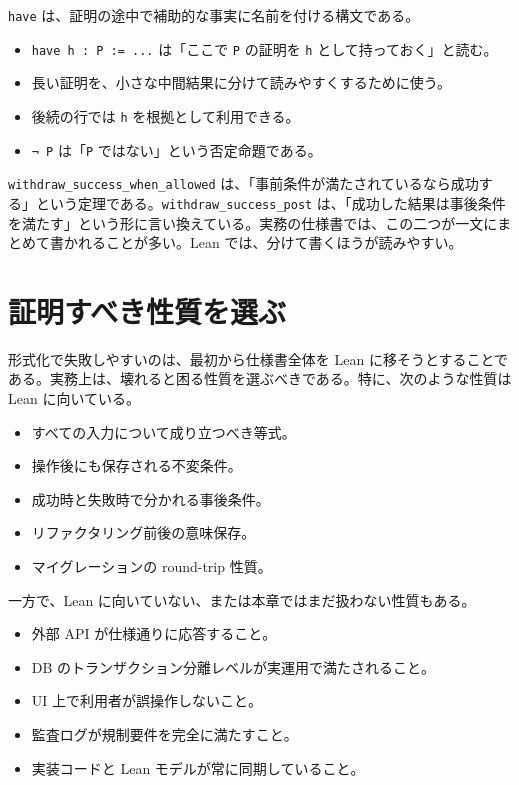 \begin{syntaxbox}
\texttt{have} は、証明の途中で補助的な事実に名前を付ける構文である。
\begin{itemize}
\item \texttt{have h : P := ...} は「ここで \texttt{P} の証明を \texttt{h} として持っておく」と読む。
\item 長い証明を、小さな中間結果に分けて読みやすくするために使う。
\item 後続の行では \texttt{h} を根拠として利用できる。
\item \texttt{¬ P} は「\texttt{P} ではない」という否定命題である。
\end{itemize}
\end{syntaxbox}


\texttt{withdraw\_success\_when\_allowed} は、「事前条件が満たされているなら成功する」という定理である。\texttt{withdraw\_success\_post} は、「成功した結果は事後条件を満たす」という形に言い換えている。実務の仕様書では、この二つが一文にまとめて書かれることが多い。Lean では、分けて書くほうが読みやすい。

\section{証明すべき性質を選ぶ}

形式化で失敗しやすいのは、最初から仕様書全体を Lean に移そうとすることである。実務上は、壊れると困る性質を選ぶべきである。特に、次のような性質は Lean に向いている。

\begin{itemize}
\item すべての入力について成り立つべき等式。
\item 操作後にも保存される不変条件。
\item 成功時と失敗時で分かれる事後条件。
\item リファクタリング前後の意味保存。
\item マイグレーションの round-trip 性質。
\end{itemize}

一方で、Lean に向いていない、または本章ではまだ扱わない性質もある。

\begin{itemize}
\item 外部 API が仕様通りに応答すること。
\item DB のトランザクション分離レベルが実運用で満たされること。
\item UI 上で利用者が誤操作しないこと。
\item 監査ログが規制要件を完全に満たすこと。
\item 実装コードと Lean モデルが常に同期していること。
\end{itemize}

